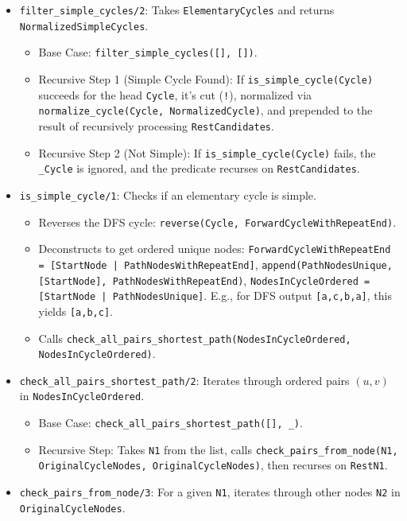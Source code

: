 \documentclass[12pt,a4paper]{article}
\begin{document}
\begin{itemize}
\item \texttt{filter\_simple\_cycles/2}: Takes \texttt{ElementaryCycles} and returns \texttt{NormalizedSimpleCycles}.
\begin{itemize}
\item Base Case: \texttt{filter\_simple\_cycles([], [])}.
\item Recursive Step 1 (Simple Cycle Found): If \texttt{is\_simple\_cycle(Cycle)} succeeds for the head \texttt{Cycle}, it's cut (\texttt{!}), normalized via \texttt{normalize\_cycle(Cycle, NormalizedCycle)}, and prepended to the result of recursively processing \texttt{RestCandidates}.
\item Recursive Step 2 (Not Simple): If \texttt{is\_simple\_cycle(Cycle)} fails, the \texttt{\_Cycle} is ignored, and the predicate recurses on \texttt{RestCandidates}.
\end{itemize}
\item \texttt{is\_simple\_cycle/1}: Checks if an elementary cycle is simple.
\begin{itemize}
\item Reverses the DFS cycle: \texttt{reverse(Cycle, ForwardCycleWithRepeatEnd)}.
\item Deconstructs to get ordered unique nodes: \texttt{ForwardCycleWithRepeatEnd = [StartNode | PathNodesWithRepeatEnd]}, \texttt{append(PathNodesUnique, [StartNode], PathNodesWithRepeatEnd)}, \texttt{NodesInCycleOrdered = [StartNode | PathNodesUnique]}. E.g., for DFS output \texttt{[a,c,b,a]}, this yields \texttt{[a,b,c]}.
\item Calls \texttt{check\_all\_pairs\_shortest\_path(NodesInCycleOrdered, NodesInCycleOrdered)}.
\end{itemize}
\item \texttt{check\_all\_pairs\_shortest\_path/2}: Iterates through ordered pairs $(u,v)$ 
 in \texttt{NodesInCycleOrdered}.
\begin{itemize}
\item Base Case: \texttt{check\_all\_pairs\_shortest\_path([], \_)}.
\item Recursive Step: Takes \texttt{N1} from the list, calls \texttt{check\_pairs\_from\_node(N1, OriginalCycleNodes, OriginalCycleNodes)}, then recurses on \texttt{RestN1}.
\end{itemize}
\item \texttt{check\_pairs\_from\_node/3}: For a given \texttt{N1}, iterates through other nodes \texttt{N2} in \texttt{OriginalCycleNodes}.
\begin{itemize}

\end{itemize}
\end{itemize}
\end{document}
